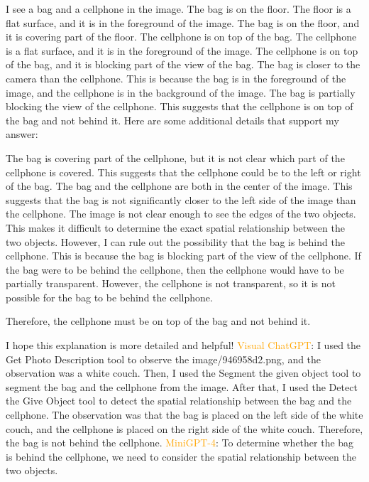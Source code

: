 \begin{enumerate}
    I see a bag and a cellphone in the image.
    The bag is on the floor. The floor is a flat surface, and it is in the foreground of the image. The bag is on the floor, and it is covering part of the floor.
    The cellphone is on top of the bag. The cellphone is a flat surface, and it is in the foreground of the image. The cellphone is on top of the bag, and it is blocking part of the view of the bag.
    The bag is closer to the camera than the cellphone. This is because the bag is in the foreground of the image, and the cellphone is in the background of the image.
    The bag is partially blocking the view of the cellphone. This suggests that the cellphone is on top of the bag and not behind it.
    Here are some additional details that support my answer:
    
    The bag is covering part of the cellphone, but it is not clear which part of the cellphone is covered. This suggests that the cellphone could be to the left or right of the bag.
    The bag and the cellphone are both in the center of the image. This suggests that the bag is not significantly closer to the left side of the image than the cellphone.
    The image is not clear enough to see the edges of the two objects. This makes it difficult to determine the exact spatial relationship between the two objects.
    However, I can rule out the possibility that the bag is behind the cellphone. This is because the bag is blocking part of the view of the cellphone. If the bag were to be behind the cellphone, then the cellphone would have to be partially transparent. However, the cellphone is not transparent, so it is not possible for the bag to be behind the cellphone.
    
    Therefore, the cellphone must be on top of the bag and not behind it.
    
    I hope this explanation is more detailed and helpful!
    \subitem \textcolor{orange}{Visual ChatGPT}: I used the Get Photo Description tool to observe the image/946958d2.png, and the observation was a white couch. Then, I used the Segment the given object tool to segment the bag and the cellphone from the image. After that, I used the Detect the Give Object tool to detect the spatial relationship between the bag and the cellphone. The observation was that the bag is placed on the left side of the white couch, and the cellphone is placed on the right side of the white couch. Therefore, the bag is not behind the cellphone.
    \subitem \textcolor{orange}{MiniGPT-4}: To determine whether the bag is behind the cellphone, we need to consider the spatial relationship between the two objects.


\end{enumerate}

